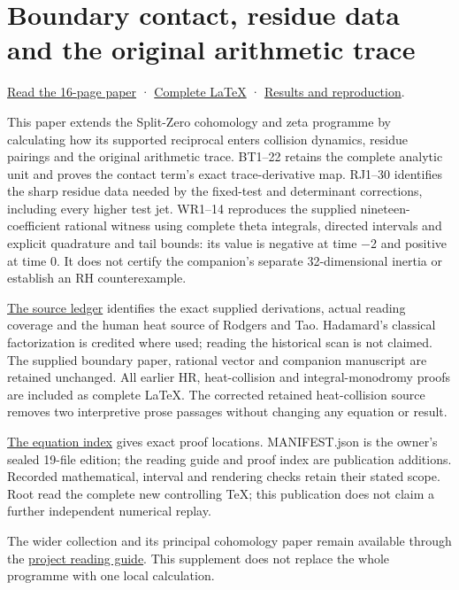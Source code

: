 \documentclass[
]{article}
\author{}
\date{}
\begin{document}
\section{Boundary contact, residue data and the original arithmetic
trace}\label{boundary-contact-residue-data-and-the-original-arithmetic-trace}

\href{BOUNDARY_RESIDUE_ARITHMETIC_RECEIVERS.pdf}{Read the 16-page paper}
· \href{BOUNDARY_RESIDUE_ARITHMETIC_RECEIVERS.tex}{Complete LaTeX} ·
\href{NEW_RESULTS_2026-09-23.md}{Results and reproduction}.

This paper extends the Split-Zero cohomology and zeta programme by
calculating how its supported reciprocal enters collision dynamics,
residue pairings and the original arithmetic trace. BT1--22 retains the
complete analytic unit and proves the contact term's exact
trace-derivative map. RJ1--30 identifies the sharp residue data needed
by the fixed-test and determinant corrections, including every higher
test jet. WR1--14 reproduces the supplied nineteen-coefficient rational
witness using complete theta integrals, directed intervals and explicit
quadrature and tail bounds: its value is negative at time −2 and
positive at time 0. It does not certify the companion's separate
32-dimensional inertia or establish an RH counterexample.

\href{SOURCE_AND_RESULT_INDEX.json}{The source ledger} identifies the
exact supplied derivations, actual reading coverage and the human heat
source of Rodgers and Tao. Hadamard's classical factorization is
credited where used; reading the historical scan is not claimed. The
supplied boundary paper, rational vector and companion manuscript are
retained unchanged. All earlier HR, heat-collision and
integral-monodromy proofs are included as complete LaTeX. The corrected
retained heat-collision source removes two interpretive prose passages
without changing any equation or result.

\href{PUBLIC_PROOF_LINKS.json}{The equation index} gives exact proof
locations. MANIFEST.json is the owner's sealed 19-file edition; the
reading guide and proof index are publication additions. Recorded
mathematical, interval and rendering checks retain their stated scope.
Root read the complete new controlling TeX; this publication does not
claim a further independent numerical replay.

The wider collection and its principal cohomology paper remain available
through the
\href{https://github.com/KokunoYumeto/zeta-function-research-reader/blob/main/README.md}{project
reading guide}. This supplement does not replace the whole programme
with one local calculation.
\end{document}
